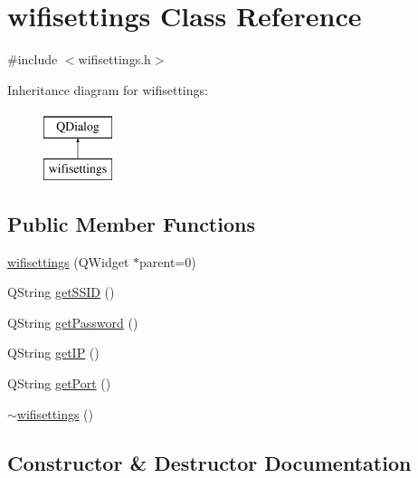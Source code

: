 \hypertarget{classwifisettings}{}\section{wifisettings Class Reference}
\label{classwifisettings}


{\ttfamily \#include $<$wifisettings.\+h$>$}

Inheritance diagram for wifisettings\+:\begin{figure}[H]
\begin{center}
\leavevmode
\includegraphics[height=2.000000cm]{classwifisettings}
\end{center}
\end{figure}
\subsection*{Public Member Functions}
\begin{DoxyCompactItemize}
\item 
\hyperlink{classwifisettings_a3ec06d77a62434c5692c40838c1568b0}{wifisettings} (Q\+Widget $\ast$parent=0)
\item 
Q\+String \hyperlink{classwifisettings_a2d5a23c9441438402bf9a858bb742a78}{get\+S\+S\+ID} ()
\item 
Q\+String \hyperlink{classwifisettings_a7ecb69434e89086e1d37158ce8187274}{get\+Password} ()
\item 
Q\+String \hyperlink{classwifisettings_a891601a5caa4148003dcb0d946052b70}{get\+IP} ()
\item 
Q\+String \hyperlink{classwifisettings_a74e1fb264f4b4dfb7d1277d2f895d177}{get\+Port} ()
\item 
\hyperlink{classwifisettings_ae88cdd7ff53ff553f4a8eba0a1dc7aa7}{$\sim$wifisettings} ()
\end{DoxyCompactItemize}


\subsection{Constructor \& Destructor Documentation}
\mbox{\label{classwifisettings_a3ec06d77a62434c5692c40838c1568b0}} 

